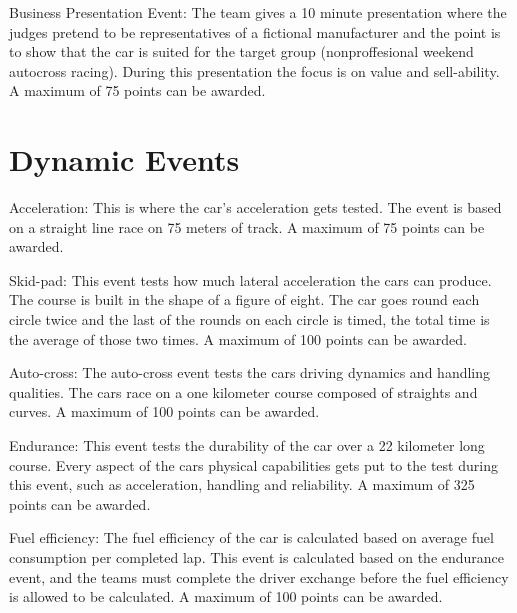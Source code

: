 Business Presentation Event:
 The team gives a 10 minute presentation where the judges pretend to be representatives of a fictional manufacturer  and the 
 point is to show that the car is suited for the target group (nonproffesional weekend autocross racing). During this 
 presentation the focus is on value and sell-ability. A maximum of 75 points can be awarded. \cite{FSG:disciplines}

\section{Dynamic Events}
Acceleration: This is where the car's acceleration gets tested. The event is based on a straight line race on 75 meters of track. A maximum 
of 75 points can be awarded. \cite{FSG:disciplines}

Skid-pad: This event tests how much lateral acceleration the cars can produce. The course is built in the shape of a figure of eight. 
The car goes round each circle twice and the last of the rounds on each circle is timed, the total time is the average of those 
two times. A maximum of 100 points can be awarded. \cite{FSG:disciplines}

Auto-cross: The auto-cross event tests the cars driving dynamics and handling qualities. 
The cars race on a one kilometer course composed of straights and curves.
A maximum of 100 points can be awarded. \cite{FSG:disciplines}

Endurance: This event tests the durability of the car over a 22 kilometer long course. Every aspect of the cars physical capabilities 
gets put to the test during this event, such as acceleration, handling and reliability. A maximum of 325 points can be awarded. \cite{FSG:disciplines}

Fuel efficiency: The fuel efficiency of the car is calculated based on average fuel consumption per completed lap. This event is calculated 
based on the endurance event, and the teams must complete the driver exchange before the fuel efficiency is allowed to be 
calculated. A maximum of 100 points can be awarded. \cite{FSG:disciplines}\\
